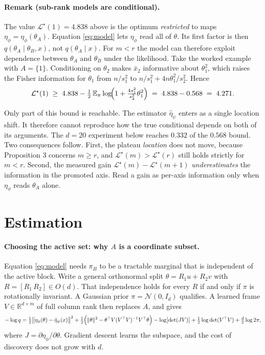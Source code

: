 \documentclass[11pt, letterpaper]{article}
\theoremstyle{definition}
\begin{document}
\paragraph{Remark (sub-rank models are conditional).}
The value $\mathcal{L}^\star(1)=4.838$ above is the optimum \emph{restricted} to
maps $\eta_\phi=\eta_\phi(\theta_A)$. Equation \eqref{eq:model} lets $\eta_\phi$
read all of $\theta$. Its first factor is then $q(\theta_A\mid\theta_B,x)$, not
$q(\theta_A\mid x)$. For $m<r$ the model can therefore exploit dependence
between $\theta_A$ and $\theta_B$ under the likelihood. Take the worked example
with $A=\{1\}$. Conditioning on $\theta_2$ makes $\bar x_2$ informative about
$\theta_1^2$, which raises the Fisher information for $\theta_1$ from $n/s_1^2$
to $n/s_1^2+4n\theta_1^2/s_2^2$. Hence
\begin{equation}
  \mathcal{L}^\star(1)\;\ge\;4.838-\tfrac12\,\mathbb{E}_\pi
  \log\!\Bigl(1+\tfrac{4s_1^2}{s_2^2}\theta_1^2\Bigr)
  \;=\;4.838-0.568\;=\;4.271 .
\end{equation}

Only part of this bound is reachable. The estimator $\hat\eta_\psi$ enters as a
single location shift. It therefore cannot reproduce how the true conditional
depends on both of its arguments. The $d=20$ experiment below reaches $0.332$
of the $0.568$ bound. Two consequences follow. First, the plateau \emph{location} does not
move, because Proposition 3 concerns $m\ge r$, and
$\mathcal{L}^\star(m)>\mathcal{L}^\star(r)$ still holds strictly for $m<r$.
Second, the measured gain $\mathcal{L}^\star(m)-\mathcal{L}^\star(m+1)$
\emph{underestimates} the information in the promoted axis. Read a gain as
per-axis information only when $\eta_\phi$ reads $\theta_A$ alone.

\section*{Estimation}

\paragraph{Choosing the active set: why $A$ is a coordinate subset.}
Equation \eqref{eq:model} needs $\pi_B$ to be a tractable marginal that is
independent of the active block. Write a general orthonormal split
$\theta=R_1u+R_2v$ with $R=[R_1\,R_2]\in O(d)$. That independence holds for
every $R$ if and only if $\pi$ is rotationally invariant. A Gaussian prior
$\pi=\mathcal{N}(0,I_d)$ qualifies. A learned frame
$V\in\mathbb{R}^{d\times m}$ of full column rank then replaces $A$, and gives
\begin{equation}
  -\log q = \tfrac12\bigl\|\eta_\phi(\theta)-\hat\eta_\psi(x)\bigr\|^2
  + \tfrac12\Bigl(\|\theta\|^2-\theta^\top V(V^\top V)^{-1}V^\top\theta\Bigr)
  - \log\bigl|\det (JV)\bigr| + \tfrac12\log\det(V^\top V)
  + \tfrac d2\log2\pi ,
  \label{eq:gaussV}
\end{equation}
where $J=\partial\eta_\phi/\partial\theta$. Gradient descent learns the
subspace, and the cost of discovery does not grow with $d$.
\end{document}
